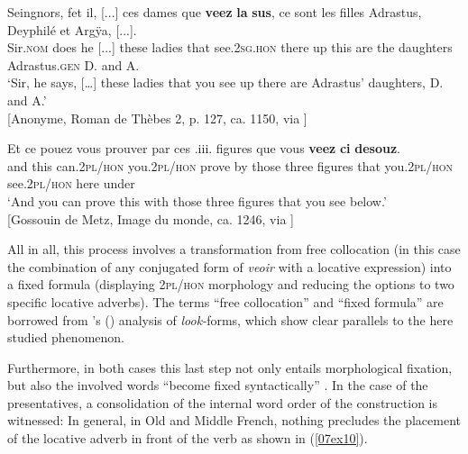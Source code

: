 \documentclass[output=paper,colorlinks,citecolor=brown]{langscibook}
\begin{document}
\begin{exe}
	\ex
	\begin{xlist}
		\ex \label{07ex9a} \gll Seingnors, fet il, [...] ces dames que \textbf{veez} \textbf{la} \textbf{sus}, ce sont les filles Adrastus, Deyphilé et Argÿa, [...]. \\
		Sir.\textsc{nom} does he [...] these ladies that see.\textsc{2sg.hon} there up this are the daughters Adrastus.\textsc{gen} D. and A. \\
		\trans ‘Sir, he says, […] these ladies that you see up there are Adrastus’ daughters, D. and A.’ \\
		\hfill [Anonyme, Roman de Thèbes 2, p. 127, ca. 1150, via \cite{bfm2019}]
		
		\ex \label{07ex9b} \gll Et ce pouez vous prouver par ces .iii. figures que vous \textbf{veez} \textbf{ci} \textbf{desouz}. \\
		and this can.\textsc{2pl/hon} you.\textsc{2pl/hon} prove by those three figures that you.\textsc{2pl/hon} see.\textsc{2pl/hon} here under \\
		\trans ‘And you can prove this with those three figures that you see below.’ \\
		\hfill [Gossouin de Metz, Image du monde, ca. 1246, via \cite{bfm2022}]
	\end{xlist}
\end{exe}

All in all, this process involves a transformation from free collocation (in this case the combination of any conjugated form of \emph{veoir} with a locative expression) into a fixed formula (displaying \textsc{2pl/hon} morphology and reducing the options to two specific locative adverbs). The terms ``free collocation'' and ``fixed formula'' are borrowed from \citeauthor{brinton2001}'s (\citeyear{brinton2001}) analysis of  \emph{look-}forms, which show clear parallels to the here studied phenomenon.

Furthermore, in both cases this last step not only entails morphological fixation, but also the involved words ``become fixed syntactically'' \citep[189]{brinton2001}. In the case of the  presentatives, a consolidation of the internal word order of the construction is witnessed: In general, in Old and Middle French, nothing precludes the placement of the locative adverb in front of the verb as shown in (\ref{07ex10}).

\end{document}
